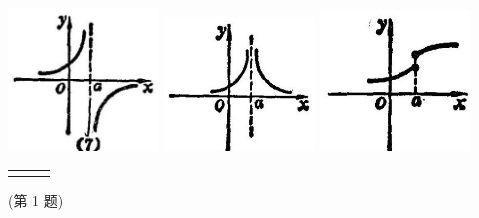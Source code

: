 \documentclass[lang=cn,newtx,12pt,scheme=chinese]{elegantbook}
\begin{document}
\begin{problemset}[练习]
\begin{center}
	\includegraphics[max width=0.3\textwidth]{images/01912c18-5c3f-733d-b775-749ba9897a9d_36_255638.jpg}
	\includegraphics[max width=0.3\textwidth]{images/01912c18-5c3f-733d-b775-749ba9897a9d_36_333878.jpg}
	\includegraphics[max width=0.3\textwidth]{images/01912c18-5c3f-733d-b775-749ba9897a9d_36_561922.jpg}
\end{center}

\noindent %
\begin{tabular}{ccc}
	\makebox[0.3\textwidth][c]{(7)} &
	\makebox[0.3\textwidth][c]{(8)} &
	\makebox[0.3\textwidth][c]{(9)}
\end{tabular}

(第 1 题)



%		
%		




\end{problemset}
\end{document}
